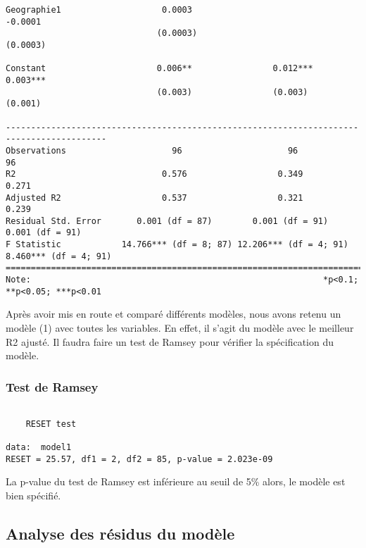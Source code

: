 \documentclass[
]{article}
\begin{document}
\begin{verbatim}
Geographie1                    0.0003                                       -0.0001       
                              (0.0003)                                     (0.0003)       
                                                                                          
Constant                      0.006**                0.012***              0.003***       
                              (0.003)                (0.003)                (0.001)       
                                                                                          
------------------------------------------------------------------------------------------
Observations                     96                     96                    96          
R2                             0.576                  0.349                  0.271        
Adjusted R2                    0.537                  0.321                  0.239        
Residual Std. Error       0.001 (df = 87)        0.001 (df = 91)        0.001 (df = 91)   
F Statistic            14.766*** (df = 8; 87) 12.206*** (df = 4; 91) 8.460*** (df = 4; 91)
==========================================================================================
Note:                                                          *p<0.1; **p<0.05; ***p<0.01
\end{verbatim}

Après avoir mis en route et comparé différents modèles, nous avons
retenu un modèle (1) avec toutes les variables. En effet, il s'agit du
modèle avec le meilleur R2 ajusté. Il faudra faire un test de Ramsey
pour vérifier la spécification du modèle.

\hypertarget{test-de-ramsey}{%
\subsubsection{Test de Ramsey}\label{test-de-ramsey}}

\begin{verbatim}

    RESET test

data:  model1
RESET = 25.57, df1 = 2, df2 = 85, p-value = 2.023e-09
\end{verbatim}

La p-value du test de Ramsey est inférieure au seuil de 5\% alors, le
modèle est bien spécifié.

\hypertarget{analyse-des-ruxe9sidus-du-moduxe8le}{%
\subsection{Analyse des résidus du
modèle}\label{analyse-des-ruxe9sidus-du-moduxe8le}}
\end{document}
